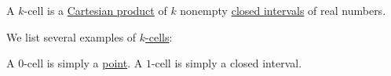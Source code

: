 \begin{definition}\label{def:k_cell}
  A \( k \)-cell is a \hyperref[def:cartesian_product]{Cartesian product} of \( k \) nonempty \hyperref[def:partially_ordered_set_interval/closed]{closed intervals} of real numbers.
\end{definition}

\begin{example}\label{ex:def:k_cell}
  We list several examples of \hyperref[def:k_cell]{\( k \)-cells}:
  \begin{thmenum}
     A \( 0 \)-cell is simply a \hyperref[rem:point]{point}.
     A \( 1 \)-cell is simply a closed interval.
  \end{thmenum}
\end{example}


